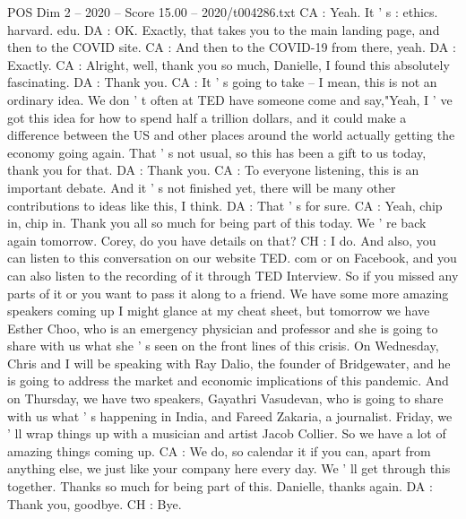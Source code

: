 \begin{textsample}{POS Dim 2 – 2020 – Score 15.00 – 2020/t004286.txt}
CA : Yeah.
It ' s : ethics. harvard. edu.
DA : OK.
Exactly, that takes you to the main landing page, and then to the COVID site.
CA : And then to the COVID-19 from there, yeah.
DA : Exactly.
CA : Alright, well, thank you so much, Danielle, I found this absolutely fascinating.
DA : Thank you.
CA : It ' s going to take -- I mean, this is not an ordinary idea.
We don ' t often at TED have someone come and say,"Yeah, I ' ve got this idea for how to spend half a trillion dollars, and it could make a difference between the US and other places around the world actually getting the economy going again.
That ' s not usual, so this has been a gift to us today, thank you for that.
DA : Thank you.
CA : To everyone listening, this is an important debate.
And it ' s not finished yet, there will be many other contributions to ideas like this, I think.
DA : That ' s for sure.
CA : Yeah, chip in, chip in.
Thank you all so much for being part of this today.
We ' re back again tomorrow.
Corey, do you have details on that?
CH : I do.
And also, you can listen to this conversation on our website TED. com or on Facebook, and you can also listen to the recording of it through TED Interview.
So if you missed any parts of it or you want to pass it along to a friend.
We have some more amazing speakers coming up I might glance at my cheat sheet, but tomorrow we have Esther Choo, who is an emergency physician and professor and she is going to share with us what she ' s seen on the front lines of this crisis.
On Wednesday, Chris and I will be speaking with Ray Dalio, the founder of Bridgewater, and he is going to address the market and economic implications of this pandemic.
And on Thursday, we have two speakers, Gayathri Vasudevan, who is going to share with us what ' s happening in India, and Fareed Zakaria, a journalist.
Friday, we ' ll wrap things up with a musician and artist Jacob Collier.
So we have a lot of amazing things coming up.
CA : We do, so calendar it if you can, apart from anything else, we just like your company here every day.
We ' ll get through this together.
Thanks so much for being part of this.
Danielle, thanks again.
DA : Thank you, goodbye.
CH : Bye.

\end{textsample}
